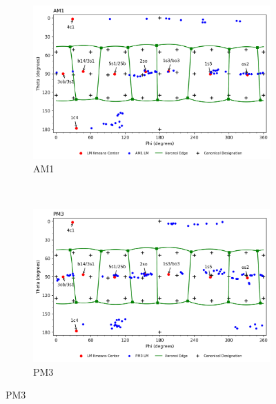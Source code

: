 \documentclass{article}
\begin{document}
\begin{figure}[H]\ContinuedFloat
	\centering
   	\begin{subfigure}[b]{0.49\textwidth}
   	\includegraphics[width=1\textwidth,keepaspectratio]
   	{figures/bxyl/overall/z_dataset-bxyl-LM-AM1-all_groupings.png}
   	\caption{AM1}
	\end{subfigure}
	~
	\begin{subfigure}[b]{0.49\textwidth}
	\includegraphics[width=1\textwidth,keepaspectratio]
   	{figures/bxyl/overall/z_dataset-bxyl-LM-PM3-all_groupings.png}
	\caption{PM3}
	\end{subfigure}
\end{figure}
\end{document}
